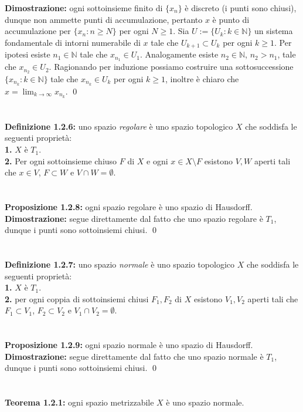 \documentclass{article}
\begin{document}
\textbf{Dimostrazione:} ogni sottoinsieme finito di $\{ x_n \}$ è discreto (i punti sono chiusi), dunque non ammette punti di accumulazione, pertanto $x$ è punto di accumulazione per $\{ x_n : n \geq N \}$ per ogni $N \geq 1$. Sia $U := \{ U_k : k \in \mathbb{N} \}$ un sistema fondamentale di intorni numerabile di $x$ tale che $U_{k + 1} \subset U_k$ per ogni $k \geq 1$. Per ipotesi esiste $n_1 \in \mathbb{N}$ tale che $x_{n_1} \in U_1$. Analogamente esiste $n_2 \in \mathbb{N}$, $n_2 > n_1$, tale che $x_{n_2} \in U_2$. Ragionando per induzione possiamo costruire una sottosuccessione $\{ x_{n_k} : k \in \mathbb{N} \}$ tale che $x_{n_k} \in U_k$ per ogni $k \geq 1$, inoltre è chiaro che $x = \lim_{k \rightarrow \infty} x_{n_k}$. \qed \\ \\ \\
\textbf{Definizione 1.2.6:} uno spazio \textit{regolare} è uno spazio topologico $X$ che soddisfa le seguenti proprietà: \\
\textbf{1.} $X$ è $T_1$. \\
\textbf{2.} Per ogni sottoinsieme chiuso $F$ di $X$ e ogni $x \in X \setminus F$ esistono $V, W$ aperti tali che $x \in V$, $F \subset W$ e $V \cap W = \emptyset$. \\ \\ \\
\textbf{Proposizione 1.2.8:} ogni spazio regolare è uno spazio di Hausdorff. \\

\textbf{Dimostrazione:} segue direttamente dal fatto che uno spazio regolare è $T_1$, dunque i punti sono sottoinsiemi chiusi. \qed \\ \\ \\
\textbf{Definizione 1.2.7:} uno spazio \textit{normale} è uno spazio topologico $X$ che soddisfa le seguenti proprietà: \\
\textbf{1.} $X$ è $T_1$. \\
\textbf{2.} per ogni coppia di sottoinsiemi chiusi $F_1, F_2$ di $X$ esistono $V_1, V_2$ aperti tali che $F_1 \subset V_1$, $F_2 \subset V_2$ e $V_1 \cap V_2 = \emptyset$. \\ \\ \\
\textbf{Proposizione 1.2.9:} ogni spazio normale è uno spazio di Hausdorff. \\

\textbf{Dimostrazione:} segue direttamente dal fatto che uno spazio normale è $T_1$, dunque i punti sono sottoinsiemi chiusi. \qed \\ \\ \\
\textbf{Teorema 1.2.1:} ogni spazio metrizzabile $X$ è uno spazio normale. \\
\end{document}
